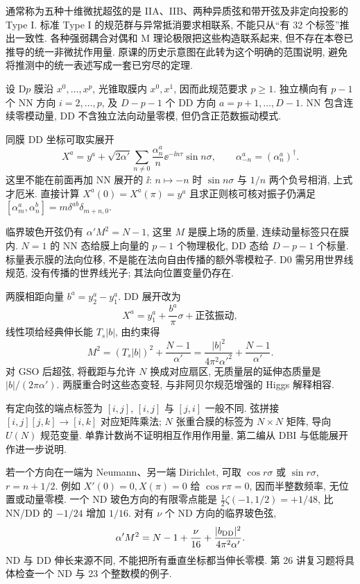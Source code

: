 通常称为五种十维微扰超弦的是 IIA、IIB、两种异质弦和带开弦及非定向投影的 Type I. 标准 Type I 的规范群与异常抵消要求相联系, 不能只从“有 32 个标签”推出一致性. 各种强弱耦合对偶和 M 理论极限把这些构造联系起来, 但不存在本卷已推导的统一非微扰作用量. 原课的历史示意图在此转为这个明确的范围说明, 避免将推测中的统一表述写成一套已穷尽的定理.

设 D$p$ 膜沿 $x^0,\ldots,x^p$, 光锥取膜内 $x^0,x^1$, 因而此规范要求 $p\geq1$. 独立横向有 $p-1$ 个 NN 方向 $i=2,\ldots,p$, 及 $D-p-1$ 个 DD 方向 $a=p+1,\ldots,D-1$. NN 包含连续零模动量, DD 不含独立法向动量零模, 但仍含正范数振动模式.

同膜 DD 坐标可取实展开
\[
 X^a=y^a+\sqrt{2\alpha'}\sum_{n\ne0}\frac{\alpha_n^a}{n}
 \ee^{-\ii n\tau}\sin n\sigma,
 \qquad\alpha_{-n}^a=(\alpha_n^a)^\dagger.
\]
这里不能在前面再加 NN 展开的 $\ii$: $n\mapsto-n$ 时 $\sin n\sigma$ 与 $1/n$ 两个负号相消, 上式才厄米. 直接计算 $X^a(0)=X^a(\pi)=y^a$ 且求正则核可核对振子仍满足 $[\alpha_m^a,\alpha_n^b]=m\delta^{ab}\delta_{m+n,0}$.

临界玻色开弦仍有 $\alpha'M^2=N-1$, 这里 $M$ 是膜上场的质量, 连续动量标签只在膜内. $N=1$ 的 NN 态给膜上向量的 $p-1$ 个物理极化, DD 态给 $D-p-1$ 个标量. 标量表示膜的法向位移, 不是能在法向自由传播的额外零模粒子. D0 需另用世界线规范, 没有传播的世界线光子; 其法向位置变量仍存在.

两膜相距向量 $b^a=y_2^a-y_1^a$. DD 展开改为
\[
 X^a=y_1^a+\frac{b^a}{\pi}\sigma+\text{正弦振动},
\]
线性项给经典伸长能 $T_s|b|$, 由约束得
\[
 M^2=(T_s|b|)^2+\frac{N-1}{\alpha'}
 =\frac{|b|^2}{4\pi^2\alpha'^2}+\frac{N-1}{\alpha'}.
\]
对 GSO 后超弦, 将截距与允许 $N$ 换成对应扇区, 无质量层的延伸态质量是 $|b|/(2\pi\alpha')$. 两膜重合时这些态变轻, 与非阿贝尔规范增强的 Higgs 解释相容.

有定向弦的端点标签为 $[i,j]$, $[i,j]$ 与 $[j,i]$ 一般不同. 弦拼接 $[i,j][j,k]\to[i,k]$ 对应矩阵乘法; $N$ 张重合膜的标签为 $N\times N$ 矩阵, 导向 $U(N)$ 规范变量. 单靠计数尚不证明相互作用作用量, 第二编从 DBI 与低能展开作进一步说明.

若一个方向在一端为 Neumann、另一端 Dirichlet, 可取 $\cos r\sigma$ 或 $\sin r\sigma$, $r=n+1/2$. 例如 $X'(0)=0,X(\pi)=0$ 给 $\cos r\pi=0$, 因而半整数频率, 无位置或动量零模. 一个 ND 玻色方向的有限零点能是 $\frac12\zeta(-1,1/2)=+1/48$, 比 NN/DD 的 $-1/24$ 增加 $1/16$. 对有 $\nu$ 个 ND 方向的临界玻色弦,
\[
 \alpha'M^2=N-1+\frac{\nu}{16}
 +\frac{|b_{\rm DD}|^2}{4\pi^2\alpha'}.
\]
ND 与 DD 伸长来源不同, 不能把所有垂直坐标都当伸长零模. 第 26 讲复习题将具体检查一个 ND 与 23 个整数模的例子.
